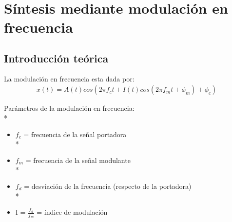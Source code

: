 \documentclass[assd_tp2_main.tex]{subfiles}
\begin{document}
\section{Síntesis mediante modulación en frecuencia}
\subsection{Introducción teórica}
La modulación en frecuencia esta dada por:
\begin{eqnarray*}
\textstyle x(t)=A(t)cos(2\pi f_c t+I(t)cos(2\pi f_mt+\phi_m)+\phi_c)
\end{eqnarray*}
\par
Parámetros de la modulación en frecuencia:\\*
\begin{itemize}
\item $f_c$ = frecuencia de la señal portadora\\*
\item $f_m$ = frecuencia de la señal modulante\\*
\item $f_d$ = desviación de la frecuencia (respecto de la portadora)\\*
\item I = $\displaystyle \frac{f_d}{f_m}$ = índice de modulación
\end{itemize}
\end{document}
